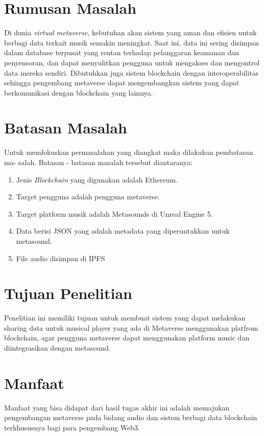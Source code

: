 \section{Rumusan Masalah}

Di dunia \emph{virtual metaverse}, kebutuhan akan sistem yang aman dan efisien untuk berbagi data terkait musik semakin meningkat. 
Saat ini, data ini sering disimpan dalam database terpusat yang rentan terhadap pelanggaran keamanan dan 
penyensoran, dan dapat menyulitkan pengguna untuk mengakses dan mengontrol data mereka sendiri. Dibutuhkan juga sistem blockchain dengan interoperabilitas sehingga
pengembang metaverse dapat mengembangkan sistem yang dapat berkomunikasi dengan blockchain yang lainnya.

\section{Batasan Masalah}

Untuk memfokuskan permasalahan yang diangkat maka dilakukan pembatasan ma-
salah. Batasan - batasan masalah tersebut diantaranya:
\begin{enumerate}
  \item Jenis \emph{Blockchain} yang digunakan adalah Ethereum.
  \item Target pengguna adalah pengguna metaverse.
  \item Target platform musik adalah Metasounds di Unreal Engine 5.
  \item Data berisi JSON yang adalah metadata yang diperuntukkan untuk metasound.
  \item File audio disimpan di IPFS
\end{enumerate}

\section{Tujuan Penelitian}

Penelitian ini memiliki tujuan untuk membuat sistem yang
dapat melakukan sharing data untuk musical player yang ada
di Metaverse menggunakan platfrom blockchain, agar 
pengguna metaverse dapat menggunakan platform music
dan diintegrasikan dengan metasound.

\section{Manfaat}
Manfaat yang bisa didapat dari hasil tugas akhir ini adalah
memajukan pengembangan metaverse pada bidang audio dan sistem berbagi data blockchain
terkhususnya bagi para pengembang Web3.
